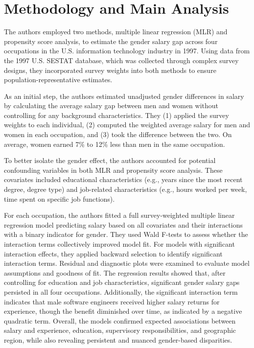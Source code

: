 \documentclass[12pt]{article}
\begin{document}
\section{Methodology and Main Analysis}

The authors employed two methods, multiple linear regression (MLR) and propensity score analysis, to estimate the gender salary gap across four occupations in the U.S. information technology industry in 1997. Using data from the 1997 U.S. SESTAT database, which was collected through complex survey designs, they incorporated survey weights into both methods to ensure population-representative estimates.

As an initial step, the authors estimated unadjusted gender differences in salary by calculating the average salary gap between men and women without controlling for any background characteristics. They (1) applied the survey weights to each individual, (2) computed the weighted average salary for men and women in each occupation, and (3) took the difference between the two. On average, women earned 7\% to 12\% less than men in the same occupation.

To better isolate the gender effect, the authors accounted for potential confounding variables in both MLR and propensity score analysis. These covariates included educational characteristics (e.g., years since the most recent degree, degree type) and job-related characteristics (e.g., hours worked per week, time spent on specific job functions).

For each occupation, the authors fitted a full survey-weighted multiple linear regression model predicting salary based on all covariates and their interactions with a binary indicator for gender. They used Wald F-tests to assess whether the interaction terms collectively improved model fit. For models with significant interaction effects, they applied backward selection to identify significant interaction terms. Residual and diagnostic plots were examined to evaluate model assumptions and goodness of fit. The regression results showed that, after controlling for education and job characteristics, significant gender salary gaps persisted in all four occupations. Additionally, the significant interaction term indicates that male software engineers received higher salary returns for experience, though the benefit diminished over time, as indicated by a negative quadratic term. Overall, the models confirmed expected associations between salary and experience, education, supervisory responsibilities, and geographic region, while also revealing persistent and nuanced gender-based disparities.
\end{document}
